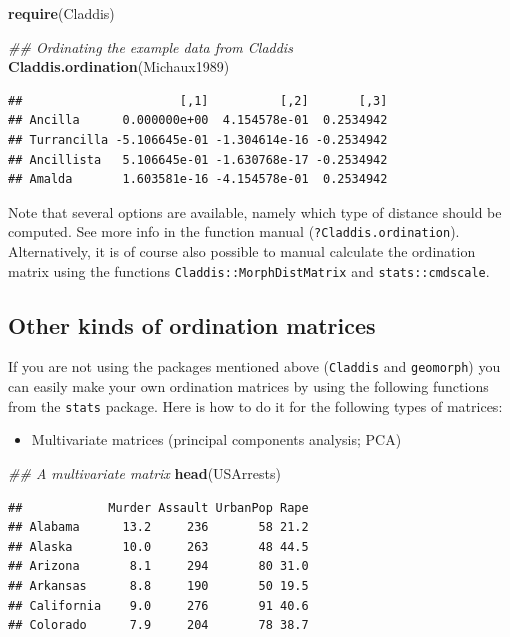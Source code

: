 \documentclass[]{book}
\newenvironment{Shaded}{\begin{snugshade}}{\end{snugshade}}
\newcommand{\CommentTok}[1]{\textcolor[rgb]{0.56,0.35,0.01}{\textit{#1}}}
\newcommand{\KeywordTok}[1]{\textcolor[rgb]{0.13,0.29,0.53}{\textbf{#1}}}
\newcommand{\NormalTok}[1]{#1}
\providecommand{\tightlist}{%
  \setlength{\itemsep}{0pt}\setlength{\parskip}{0pt}}
\begin{document}
\begin{Shaded}
\begin{Highlighting}[]
\KeywordTok{require}\NormalTok{(Claddis)}

\CommentTok{## Ordinating the example data from Claddis}
\KeywordTok{Claddis.ordination}\NormalTok{(Michaux1989) }
\end{Highlighting}
\end{Shaded}

\begin{verbatim}
##                      [,1]          [,2]       [,3]
## Ancilla      0.000000e+00  4.154578e-01  0.2534942
## Turrancilla -5.106645e-01 -1.304614e-16 -0.2534942
## Ancillista   5.106645e-01 -1.630768e-17 -0.2534942
## Amalda       1.603581e-16 -4.154578e-01  0.2534942
\end{verbatim}

Note that several options are available, namely which type of distance should be computed.
See more info in the function manual (\texttt{?Claddis.ordination}).
Alternatively, it is of course also possible to manual calculate the ordination matrix using the functions \texttt{Claddis::MorphDistMatrix} and \texttt{stats::cmdscale}.

\hypertarget{other-kinds-of-ordination-matrices}{%
\subsection{Other kinds of ordination matrices}\label{other-kinds-of-ordination-matrices}}

If you are not using the packages mentioned above (\texttt{Claddis} and \texttt{geomorph}) you can easily make your own ordination matrices by using the following functions from the \texttt{stats} package.
Here is how to do it for the following types of matrices:

\begin{itemize}
\tightlist
\item
  Multivariate matrices (principal components analysis; PCA)
\end{itemize}

\begin{Shaded}
\begin{Highlighting}[]
\CommentTok{## A multivariate matrix}
\KeywordTok{head}\NormalTok{(USArrests)}
\end{Highlighting}
\end{Shaded}

\begin{verbatim}
##            Murder Assault UrbanPop Rape
## Alabama      13.2     236       58 21.2
## Alaska       10.0     263       48 44.5
## Arizona       8.1     294       80 31.0
## Arkansas      8.8     190       50 19.5
## California    9.0     276       91 40.6
## Colorado      7.9     204       78 38.7
\end{verbatim}
\end{document}
